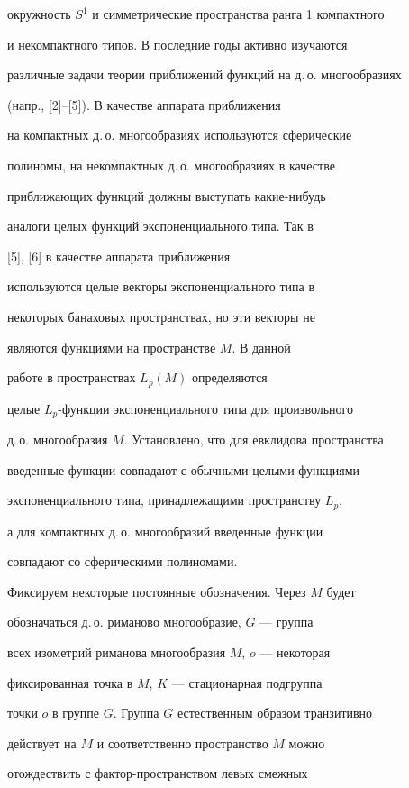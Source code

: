 окружность $S^1$ и симметрические пространства ранга 1 компактного


и некомпактного типов. В последние годы активно изучаются


различные задачи теории приближений функций на д.\,о. многообразиях


(напр., [2]--[5]). В качестве аппарата приближения


на компактных д.\,о. многообразиях используются сферические


полиномы, на некомпактных д.\,о. многообразиях в качестве


приближающих функций должны выступать какие-нибудь


аналоги целых функций экспоненциального типа. Так в


[5], [6] в качестве аппарата приближения


используются целые векторы экспоненциального типа в


некоторых банаховых пространствах, но эти векторы не


являются функциями на пространстве $M$. В данной


работе в пространствах $L_p(M)$ определяются


целые $L_p$-функции экспоненциального типа для произвольного


д.\,о. многообразия $M$. Установлено, что для евклидова пространства


введенные функции совпадают с обычными целыми функциями


экспоненциального типа, принадлежащими пространству $L_p$,


а для компактных д.\,о. многообразий введенные функции


совпадают со сферическими полиномами.





Фиксируем некоторые постоянные обозначения. Через $M$ будет


обозначаться д.\,о. риманово многообразие, $G$ --- группа


всех изометрий риманова многообразия $M$, $o$ --- некоторая


фиксированная точка в $M$, $K$ --- стационарная подгруппа


точки $o$ в группе $G$. Группа $G$ естественным образом транзитивно


действует на $M$ и соответственно пространство $M$ можно


отождествить с фактор-пространством левых смежных


